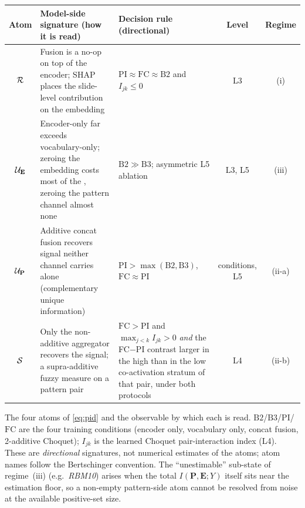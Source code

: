 \footnotesize
\setlength{\tabcolsep}{4pt}
\renewcommand{\arraystretch}{1.25}
\begin{tabularx}{\linewidth}{@{}c X X c c@{}}
\toprule
\textbf{Atom} & \textbf{Model-side signature (how it is read)} &
  \textbf{Decision rule (directional)} & \textbf{Level} & \textbf{Regime} \\
\midrule
$\mathcal{R}$
  & Fusion is a no-op on top of the encoder; SHAP places the slide-level
    contribution on the embedding
  & $\mathrm{PI}\!\approx\!\mathrm{FC}\!\approx\!\mathrm{B2}$ and
    $I_{jk}\!\le\!0$
  & L3 & (i) \\
$\mathcal{U}_{\mathbf{E}}$
  & Encoder-only far exceeds vocabulary-only; zeroing the embedding costs
    most of the \auroc{}, zeroing the pattern channel almost none
  & $\mathrm{B2}\!\gg\!\mathrm{B3}$; asymmetric L5 ablation
  & L3, L5 & (iii) \\
$\mathcal{U}_{\mathbf{P}}$
  & Additive concat fusion recovers signal neither channel carries alone
    (complementary unique information)
  & $\mathrm{PI}\!>\!\max(\mathrm{B2},\mathrm{B3})$,
    $\mathrm{FC}\!\approx\!\mathrm{PI}$
  & conditions, L5 & (ii-a) \\
$\mathcal{S}$
  & Only the non-additive aggregator recovers the signal; a supra-additive
    fuzzy measure on a pattern pair
  & $\mathrm{FC}\!>\!\mathrm{PI}$ and $\max_{j<k} I_{jk}\!>\!0$
    \emph{and} the FC${-}$PI contrast larger in the high than in the low
    co-activation stratum of that pair, under both protocols
  & L4 & (ii-b) \\
\bottomrule
\end{tabularx}
\begin{flushleft}\footnotesize
The four atoms of \cref{eq:pid} and the observable by which each is read.
$\mathrm{B2}$/$\mathrm{B3}$/$\mathrm{PI}$/$\mathrm{FC}$ are the four training
conditions (encoder only, vocabulary only, concat fusion, 2-additive
Choquet); $I_{jk}$ is the learned Choquet pair-interaction index (L4).
These are \emph{directional} signatures, not numerical estimates of the
atoms; atom names follow the Bertschinger
convention.\cite{bertschinger2014unique} The ``unestimable'' sub-state of regime~(iii)
(e.g.\ \textit{RBM10}) arises when the total $I(\mathbf{P},\mathbf{E};Y)$
itself sits near the estimation floor, so a non-empty pattern-side atom
cannot be resolved from noise at the available positive-set size.
\end{flushleft}
